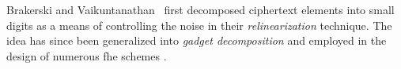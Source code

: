 Brakerski and Vaikuntanathan~\cite{cryptoeprint:2011/344} first decomposed ciphertext elements into small digits as a means of controlling the noise in their \emph{relinearization} technique. %
The idea has since been generalized into \emph{gadget decomposition} and employed in the design of numerous \gls{fhe} schemes %
\cite{cryptoeprint:2011/277, cryptoeprint:2012/078, cryptoeprint:2012/144, cryptoeprint:2013/340, cryptoeprint:2014/816, cryptoeprint:2016/421, cryptoeprint:2018/421}.


